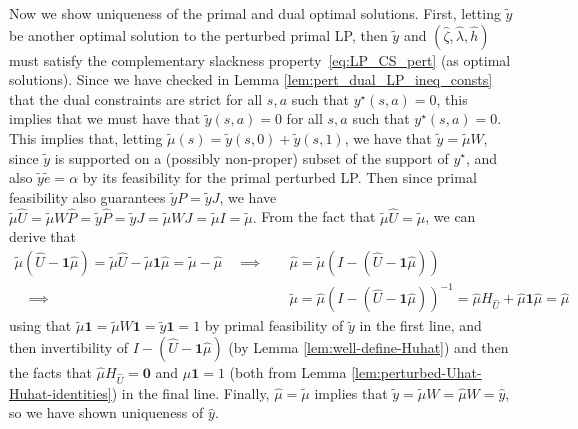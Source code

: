 \documentclass[mnsc,nonblindrev]{informs3}
\newcommand{\Phat}{\widehat{P}}
\newcommand{\one}{\mathbf{1}}
\newcommand{\hhat}{\widehat{h}}
\newcommand{\zero}{\mathbf{0}}
\newcommand{\muhat}{\widehat{\mu}}
\newcommand{\uhat}{\widehat{U}}
\newcommand{\yhat}{\widehat{y}}
\newcommand{\zetahat}{\widehat{\zeta}}
\newcommand{\lambdahat}{\widehat{\lambda}}
\begin{document}
\begin{APPENDICES}
Now we show uniqueness of the primal and dual optimal solutions. First, letting $\tilde{y}$ be another optimal solution to the perturbed primal LP, then $\tilde{y}$ and $(\zetahat, \lambdahat, \hhat)$ must satisfy the complementary slackness property~\eqref{eq:LP_CS_pert} (as optimal solutions). Since we have checked in Lemma \ref{lem:pert_dual_LP_ineq_consts} that the dual constraints are strict for all $s,a$ such that $y^\star(s,a) = 0$, this implies that we must have that $\tilde{y}(s,a)=0$ for all $s,a$ such that $y^\star(s,a)=0$. This implies that, letting $\tilde{\mu}(s)= \tilde{y}(s,0)+\tilde{y}(s,1)$, we have that $\tilde{y} = \tilde{\mu} W$, since $\tilde{y}$ is supported on a (possibly non-proper) subset of the support of $y^\star$, and also $\tilde{y} \tilde{e} = \alpha$ by its feasibility for the primal perturbed LP. Then since primal feasibility also guarantees $\tilde{y}P = \tilde{y}J$, we have
$
    \tilde{\mu} \uhat = \tilde{\mu} W \Phat = \tilde{y} \Phat = \tilde{y} J = \tilde{\mu} W J = \tilde{\mu} I = \tilde{\mu}.
$
From the fact that $\tilde{\mu} \uhat = \tilde{\mu}$, we can derive that
\begin{align*}
    \tilde{\mu} (\uhat - \one \muhat) = \tilde{\mu}\uhat - \tilde{\mu}\one \muhat = \tilde{\mu} - \muhat 
    \quad\implies\quad &\muhat = \tilde{\mu}\left(I - (\uhat - \one \muhat) \right) \\
    \quad\implies\quad & \tilde{\mu} = \muhat \left(I - (\uhat - \one \muhat) \right)^{-1} = \muhat H_{\uhat} + \muhat \one \muhat = \muhat
\end{align*}
using that $\tilde{\mu} \one = \tilde{\mu} W \one = \tilde{y} \one = 1$ by primal feasibility of $\tilde{y}$ in the first line, and then invertibility of $I - (\uhat - \one \muhat)$ (by Lemma \ref{lem:well-define-Huhat}) and then the facts that $\muhat H_{\uhat} = \zero$ and $\muhat \one = 1$ (both from Lemma \ref{lem:perturbed-Uhat-Huhat-identities}) in the final line. Finally, $\muhat = \tilde{\mu}$ implies that $\tilde{y} = \tilde{\mu} W = \muhat W = \yhat$, so we have shown uniqueness of $\yhat$.


\end{APPENDICES}
\end{document}
